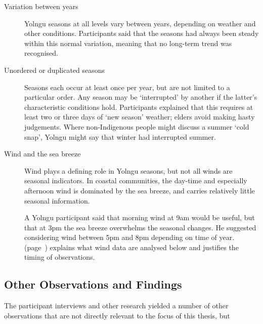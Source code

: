 \begin{description}
\item[Variation between years]
    Yolngu seasons at all levels vary between years, depending on weather and other conditions.
    Participants said that the seasons had always been steady within this
    normal variation, meaning that no long-term trend was recognised.

\item[Unordered or duplicated seasons]
    Seasons each occur at least once per year, but are not limited to a particular order.
    Any season may be `interrupted' by another if the latter's characteristic
    conditions hold.  Participants explained that this requires at least two
    or three days of `new season' weather; elders avoid making hasty judgements.
    Where non-Indigenous people might discuss a summer `cold snap', Yolngu might
    say that winter had interrupted summer.

\item[Wind and the sea breeze]
    Wind plays a defining role in Yolngu seasons, but not all winds are
    seasonal indicators.  In coastal communities, the day-time and especially
    afternoon wind is dominated by the sea breeze, and carries relatively little
    seasonal information.

    A Yolngu participant said that morning wind at 9am would be useful, but
    that at 3pm the sea breeze overwhelms the seasonal changes.  He suggested
    considering wind between 5pm and 8pm depending on time of year.
     (page~\pageref{ssec:weather-methods}) explains
    what wind data are analysed below and justifies the timing of observations.
\end{description}


\subsection{Other Observations and Findings}

The participant interviews and other research yielded a number of other
observations that are not directly relevant to the focus of this thesis,
but

